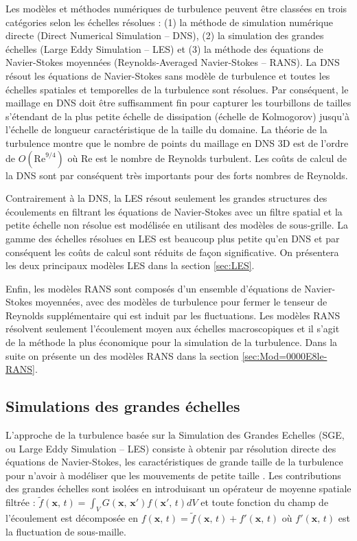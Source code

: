 Les mod\`eles et m\'ethodes num\'eriques de turbulence peuvent \^etre class\'ees
en trois cat\'egories selon les \'echelles r\'esolues : (1) la m\'ethode de
simulation num\'erique directe (Direct Numerical Simulation -- DNS),
(2) la simulation des grandes \'echelles (Large Eddy Simulation -- LES)
et (3) la m\'ethode des \'equations de Navier-Stokes moyenn\'ees (Reynolds-Averaged
Navier-Stokes -- RANS). La DNS r\'esout les \'equations de Navier-Stokes
sans mod\`ele de turbulence et toutes les \'echelles spatiales et temporelles
de la turbulence sont r\'esolues. Par cons\'equent, le maillage en DNS
doit \^etre suffisamment fin pour capturer les tourbillons de tailles
s'\'etendant de la plus petite \'echelle de dissipation (\'echelle de Kolmogorov)
jusqu'\`a l'\'echelle de longueur caract\'eristique de la taille du domaine.
La th\'eorie de la turbulence montre que le nombre de points du maillage
en DNS 3D est de l'ordre de $O(\mbox{Re}^{9/4})$ o\`u $\mbox{Re}$
est le nombre de Reynolds turbulent. Les co\^uts de calcul de la DNS
sont par cons\'equent tr\`es importants pour des forts nombres de Reynolds.

Contrairement \`a la DNS, la LES r\'esout seulement les grandes structures
des \'ecoulements en filtrant les \'equations de Navier-Stokes avec un
filtre spatial et la petite \'echelle non r\'esolue est mod\'elis\'ee en utilisant
des mod\`eles de sous-grille. La gamme des \'echelles r\'esolues en LES
est beaucoup plus petite qu'en DNS et par cons\'equent les co\^uts de
calcul sont r\'eduits de fa\c con significative. On pr\'esentera les deux
principaux mod\`eles LES dans la section \ref{sec:LES}.

Enfin, les mod\`eles RANS sont compos\'es d'un ensemble d'\'equations de
Navier-Stokes moyenn\'ees, avec des mod\`eles de turbulence pour fermer
le tenseur de Reynolds suppl\'ementaire qui est induit par les fluctuations.
Les mod\`eles RANS r\'esolvent seulement l'\'ecoulement moyen aux \'echelles
macroscopiques et il s'agit de la m\'ethode la plus \'economique pour
la simulation de la turbulence. Dans la suite on pr\'esente un des mod\`eles
RANS dans la section \ref{sec:Mod=0000E8le-RANS}.


\subsection{\label{sec:LES}Simulations des grandes \'echelles}

L'approche de la turbulence bas\'ee sur la Simulation des Grandes Echelles
(SGE, ou Large Eddy Simulation -- LES) consiste \`a obtenir par r\'esolution
directe des \'equations de Navier-Stokes, les caract\'eristiques de grande
taille de la turbulence pour n'avoir \`a mod\'eliser que les mouvements
de \og petite taille \fg{}. Les contributions des grandes \'echelles
sont isol\'ees en introduisant un op\'erateur de moyenne spatiale filtr\'ee
: $\tilde{f}(\mathbf{x},\,t)=\int_{V}G(\mathbf{x},\,\mathbf{x}')f(\mathbf{x}',\,t)dV$
et toute fonction du champ de l'\'ecoulement est d\'ecompos\'ee en $f(\mathbf{x},\,t)=\tilde{f}(\mathbf{x},\,t)+f'(\mathbf{x},\,t)$
o\`u $f'(\mathbf{x},\,t)$ est la fluctuation de sous-maille.

